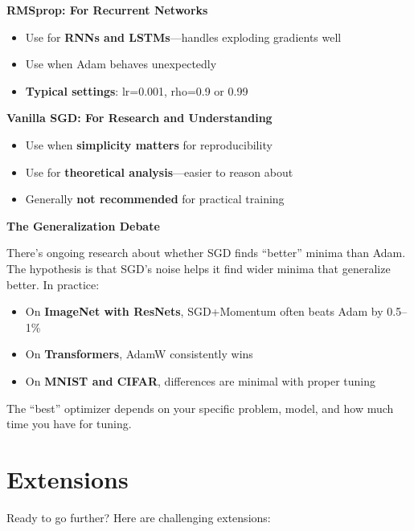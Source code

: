 \documentclass[../../main.tex]{subfiles}
\begin{document}
\begin{principle}
\textbf{RMSprop: For Recurrent Networks}
\begin{itemize}
    \item Use for \textbf{RNNs and LSTMs}---handles exploding gradients well
    \item Use when Adam behaves unexpectedly
    \item \textbf{Typical settings}: lr=0.001, rho=0.9 or 0.99
\end{itemize}
\end{principle}

\begin{principle}
\textbf{Vanilla SGD: For Research and Understanding}
\begin{itemize}
    \item Use when \textbf{simplicity matters} for reproducibility
    \item Use for \textbf{theoretical analysis}---easier to reason about
    \item Generally \textbf{not recommended} for practical training
\end{itemize}
\end{principle}

\begin{perspective}
\textbf{The Generalization Debate}

There's ongoing research about whether SGD finds ``better'' minima than Adam. The hypothesis is that SGD's noise helps it find wider minima that generalize better. In practice:
\begin{itemize}
    \item On \textbf{ImageNet with ResNets}, SGD+Momentum often beats Adam by 0.5--1\%
    \item On \textbf{Transformers}, AdamW consistently wins
    \item On \textbf{MNIST and CIFAR}, differences are minimal with proper tuning
\end{itemize}
The ``best'' optimizer depends on your specific problem, model, and how much time you have for tuning.
\end{perspective}

\section{Extensions}
\label{sec:capstone-extensions}

Ready to go further? Here are challenging extensions:
\end{document}
